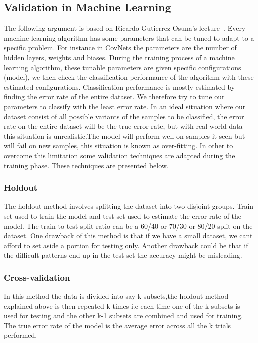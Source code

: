 \documentclass[12pt, a4paper,oneside]{report}
\begin{document}
\subsection{Validation in Machine Learning}
The following argument is based on Ricardo Gutierrez-Osuna's lecture~\cite{validation}.
Every machine learning algorithm has some parameters that can be tuned to adapt to a specific problem. For instance in CovNets the parameters are the number of hidden layers, weights and biases. 
During the training process of a machine learning algorithm, these tunable parameters are given specific configurations (model), we then check the classification performance of the algorithm with these estimated configurations. Classification performance is mostly estimated by finding the error rate of the entire dataset. We therefore try to tune our parameters to classify with the least error rate. In an ideal situation where our dataset consist of all possible variants of the samples to be classified, the error rate on the entire dataset will be the true error rate, but with real world data this situation is unrealistic.The model will perform well on samples it seen but will fail on new samples, this situation is known as over-fitting. In other to overcome this limitation some validation techniques are adapted during the training phase. These techniques are presented below.

\subsubsection{Holdout}
The holdout method involves splitting the dataset into two disjoint groups. Train set used to train the model and test set used to estimate the error rate of the model. The train to test split ratio can be a 60/40 or 70/30 or 80/20 split on the dataset. One drawback of this method is that if we have a small dataset, we cant afford to set aside a portion for testing only. Another drawback could be that if the difficult patterns end up in the test set the accuracy might be misleading.

\subsubsection{Cross-validation}
In this method the data is divided into say k subsets,the holdout method explained above is then repeated k times i.e each time one of the k subsets is used for testing and the other k-1 subsets are combined and used for training. The true error rate of the model is the average error across all the k trials performed.
\end{document}
